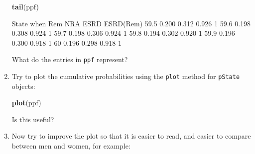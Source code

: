 \documentclass[
]{book}
\newenvironment{Shaded}{\begin{snugshade}}{\end{snugshade}}
\newcommand{\FunctionTok}[1]{\textcolor[rgb]{0.13,0.29,0.53}{\textbf{#1}}}
\newcommand{\NormalTok}[1]{#1}
\begin{document}
\begin{enumerate}
\begin{Shaded}
\begin{Highlighting}[]
\FunctionTok{tail}\NormalTok{(ppf)}
\end{Highlighting}
\end{Shaded}

\begin{Shaded}
\begin{Highlighting}[]
\NormalTok{      State}
\NormalTok{when     Rem   NRA  ESRD ESRD(Rem)}
\NormalTok{  59.5 0.200 0.312 0.926         1}
\NormalTok{  59.6 0.198 0.308 0.924         1}
\NormalTok{  59.7 0.198 0.306 0.924         1}
\NormalTok{  59.8 0.194 0.302 0.920         1}
\NormalTok{  59.9 0.196 0.300 0.918         1}
\NormalTok{  60   0.196 0.298 0.918         1}
\end{Highlighting}
\end{Shaded}

  What do the entries in \texttt{ppf} represent?
\item
  Try to plot the cumulative probabilities using the \texttt{plot} method
  for \texttt{pState} objects:

\begin{Shaded}
\begin{Highlighting}[]
\FunctionTok{plot}\NormalTok{(ppf)}
\end{Highlighting}
\end{Shaded}

  Is this useful?
\item
  Now try to improve the plot so that it is easier to read, and
  easier to compare between men and women, for example:


\end{enumerate}
\end{document}
